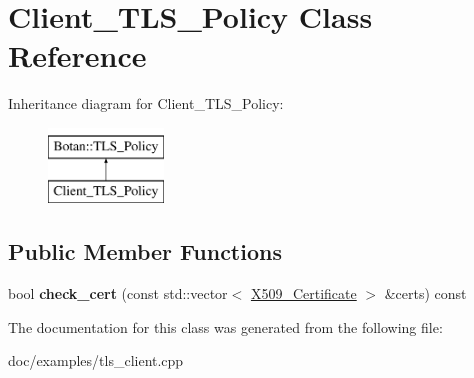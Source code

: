 \hypertarget{classClient__TLS__Policy}{\section{Client\-\_\-\-T\-L\-S\-\_\-\-Policy Class Reference}
\label{classClient__TLS__Policy}
}
Inheritance diagram for Client\-\_\-\-T\-L\-S\-\_\-\-Policy\-:\begin{figure}[H]
\begin{center}
\leavevmode
\includegraphics[height=2.000000cm]{classClient__TLS__Policy}
\end{center}
\end{figure}
\subsection*{Public Member Functions}
\begin{DoxyCompactItemize}
\item 
\hypertarget{classClient__TLS__Policy_a9284625b6b205270b80c7165fa204404}{bool {\bfseries check\-\_\-cert} (const std\-::vector$<$ \hyperlink{classBotan_1_1X509__Certificate}{X509\-\_\-\-Certificate} $>$ \&certs) const }\label{classClient__TLS__Policy_a9284625b6b205270b80c7165fa204404}

\end{DoxyCompactItemize}


The documentation for this class was generated from the following file\-:\begin{DoxyCompactItemize}
\item 
doc/examples/tls\-\_\-client.\-cpp\end{DoxyCompactItemize}
